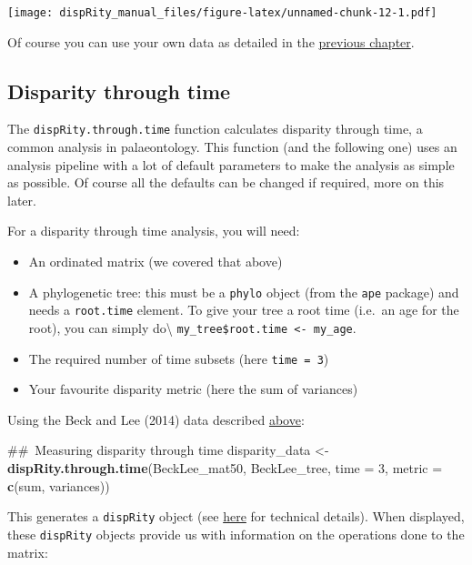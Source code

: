 \documentclass[]{book}
\newenvironment{Shaded}{\begin{snugshade}}{\end{snugshade}}
\newcommand{\KeywordTok}[1]{\textcolor[rgb]{0.13,0.29,0.53}{\textbf{#1}}}
\newcommand{\DataTypeTok}[1]{\textcolor[rgb]{0.13,0.29,0.53}{#1}}
\newcommand{\DecValTok}[1]{\textcolor[rgb]{0.00,0.00,0.81}{#1}}
\newcommand{\StringTok}[1]{\textcolor[rgb]{0.31,0.60,0.02}{#1}}
\newcommand{\NormalTok}[1]{#1}
\providecommand{\tightlist}{%
  \setlength{\itemsep}{0pt}\setlength{\parskip}{0pt}}
\theoremstyle{definition}
\theoremstyle{definition}
\theoremstyle{definition}
\theoremstyle{remark}
\begin{document}
\texttt{[image: dispRity\_manual\_files/figure-latex/unnamed-chunk-12-1.pdf]}

Of course you can use your own data as detailed in the
\protect\hyperlink{What-sort-of-data-does-dispRity-work-with}{previous
chapter}.

\subsection{Disparity through time}\label{disparity-through-time}

The \texttt{dispRity.through.time} function calculates disparity through
time, a common analysis in palaeontology. This function (and the
following one) uses an analysis pipeline with a lot of default
parameters to make the analysis as simple as possible. Of course all the
defaults can be changed if required, more on this later.

For a disparity through time analysis, you will need:

\begin{itemize}
\tightlist
\item
  An ordinated matrix (we covered that above)
\item
  A phylogenetic tree: this must be a \texttt{phylo} object (from the
  \texttt{ape} package) and needs a \texttt{root.time} element. To give
  your tree a root time (i.e.~an age for the root), you can simply
  do\textbackslash{}
  \texttt{my\_tree\$root.time\ \textless{}-\ my\_age}.
\item
  The required number of time subsets (here \texttt{time\ =\ 3})
\item
  Your favourite disparity metric (here the sum of variances)
\end{itemize}

Using the Beck and Lee (2014) data described
\protect\hyperlink{example-data}{above}:

\begin{Shaded}
\begin{Highlighting}[]
\NormalTok{## Measuring disparity through time}
\NormalTok{disparity_data <-}\StringTok{ }\KeywordTok{dispRity.through.time}\NormalTok{(BeckLee_mat50, BeckLee_tree,}
                                        \DataTypeTok{time =} \DecValTok{3}\NormalTok{, }\DataTypeTok{metric =} \KeywordTok{c}\NormalTok{(sum, variances))}
\end{Highlighting}
\end{Shaded}

This generates a \texttt{dispRity} object (see
\protect\hyperlink{guts}{here} for technical details). When displayed,
these \texttt{dispRity} objects provide us with information on the
operations done to the matrix:
\end{document}
